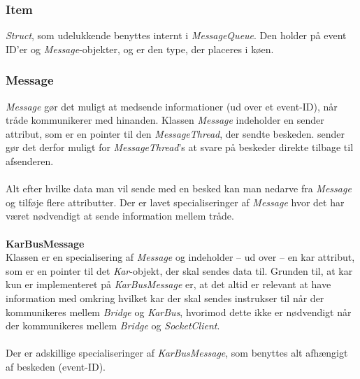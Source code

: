 {
}

\subsubsection{Item}

\textit{Struct}, som udelukkende benyttes internt i \textit{MessageQueue}. Den holder på event ID'er og \textit{Message}-objekter, og er den type, der placeres i køen.


\subsubsection{Message}

\textit{Message} gør det muligt at medsende informationer (ud over et event-ID), når tråde kommunikerer med hinanden. Klassen \textit{Message} indeholder en sender attribut, som er en pointer til den \textit{MessageThread}, der sendte beskeden. sender gør det derfor muligt for \textit{MessageThread}'s at svare på beskeder direkte tilbage til afsenderen.\\\\

Alt efter hvilke data man vil sende med en besked kan man nedarve fra \textit{Message} og tilføje flere attributter.  Der er lavet specialiseringer af \textit{Message} hvor det har været nødvendigt at sende information mellem tråde.\\\\

\textbf{KarBusMessage}\\
Klassen er en specialisering af \textit{Message} og indeholder – ud over  – en kar attribut, som er en pointer til det \textit{Kar}-objekt, der skal sendes data til. Grunden til, at kar kun er implementeret på \textit{KarBusMessage} er, at det altid er relevant at have information med omkring hvilket kar der skal sendes instrukser til når der kommunikeres mellem \textit{Bridge} og \textit{KarBus}, hvorimod dette ikke er nødvendigt når der kommunikeres mellem \textit{Bridge} og \textit{SocketClient}.\\\\

Der er adskillige specialiseringer af \textit{KarBusMessage}, som benyttes alt afhængigt af beskeden (event-ID).\\\\

